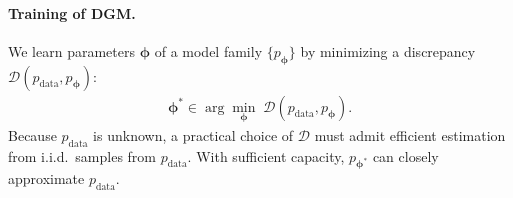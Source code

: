 



\paragraph{Training of DGM.}
We learn parameters $\bm{\phi}$ of a model family $\{p_{\bm{\phi}}\}$ by minimizing a discrepancy $\mathcal{D}(p_{\mathrm{data}},p_{\bm{\phi}})$:
\begin{align}\label{eq:dgm-optimization}
  \bm{\phi}^\ast \in \arg\min_{\bm{\phi}}\; \mathcal{D}(p_{\mathrm{data}},p_{\bm{\phi}}).
\end{align}
Because $p_{\mathrm{data}}$ is unknown, a practical choice of $\mathcal{D}$ must admit efficient estimation from i.i.d.\ samples
from $ p_{\mathrm{data}}$. With sufficient capacity, $p_{\bm{\phi}^\ast}$ can closely approximate $p_{\mathrm{data}}$.

